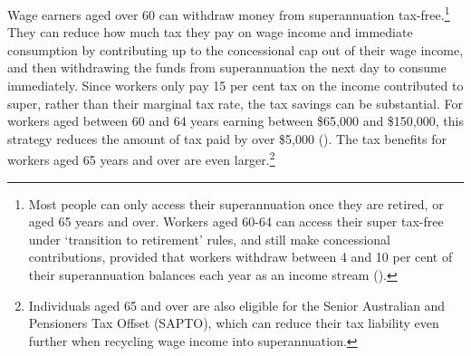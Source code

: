 \documentclass{grattanAlpha}
\begin{document}
Wage earners aged over 60 can withdraw money from superannuation tax-free.\footnote{Most people can only access their superannuation once they are retired, or aged 65 years and over. Workers aged 60-64 can access their super tax-free under ‘transition to retirement’ rules, and still make concessional contributions, provided that workers withdraw between 4 and 10 per cent of their superannuation balances each year as an income stream (\textcites[][143]{ProductivityCommission2015SuperPolicyPostRetirement}{ATO2015al}).}  They can reduce how much tax they pay on wage income and immediate consumption by contributing up to the concessional cap out of their wage income, and then withdrawing the funds from superannuation the next day to consume immediately. Since workers only pay 15 per cent tax on the income contributed to super, rather than their marginal tax rate, the tax savings can be substantial. For workers aged between 60 and 64 years earning between \$65,000 and \$150,000, this strategy reduces the amount of tax paid by over \$5,000 (). The tax benefits for workers aged 65 years and over are even larger.\footnote{Individuals aged 65 and over are also eligible for the Senior Australian and Pensioners Tax Offset (SAPTO), which can reduce their tax liability even further when recycling wage income into superannuation.}  
\end{document}
